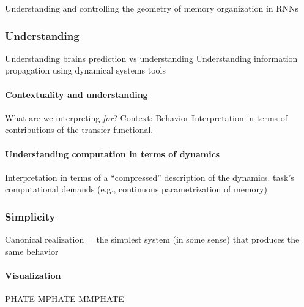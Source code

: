 \documentclass{article}
\theoremstyle{definition} \newtheorem{definition}{Definition}  \newtheorem{example}{Example}
\theoremstyle{remark} \newtheorem{remark}{Remark}
\newcounter{ct}
\begin{document}
Understanding and controlling the geometry of memory organization in RNNs \citep{haputhanthri2025understanding}


\subsubsection{Understanding}\label{sec:understanding}
\citep{deregt2017understanding}
\citep{potochnik2017idealization}
\citep{guest2023logical}
Understanding brains \citep{marder2015understanding} \citep{lindsay2023testing} \citep{barman2024towards} \citep{dowling2018understanding}
prediction vs understanding \citep{chirimuuta2021prediction}
Understanding information propagation using dynamical systems tools \citep{vogt2022lyapunov}


\paragraph{Contextuality and understanding}
What are we interpreting \emph{for}?
Context: Behavior %
Interpretation in terms of contributions of the transfer functional. 


\paragraph{Understanding computation in terms of dynamics}
Interpretation in terms of a ``compressed'' description of the dynamics.
%
task's computational demands (e.g., continuous parametrization of memory)


\subsubsection{Simplicity}
\citep{gao2015simplicity}
\citep{dyer2023simplest}
\citep{quinn2022information}%
%
Canonical realization = the simplest system (in some sense) that produces the same behavior


\paragraph{Visualization}
\citep{deregt2017understanding}
\citep{karpathy2015visualizing}
PHATE \citep{moon2017visualizing}
MPHATE\citep{gigante2019visualizing}
MMPHATE\citep{xie2024multiway} 
\citep{madsen2019visualizing}
\end{document}
